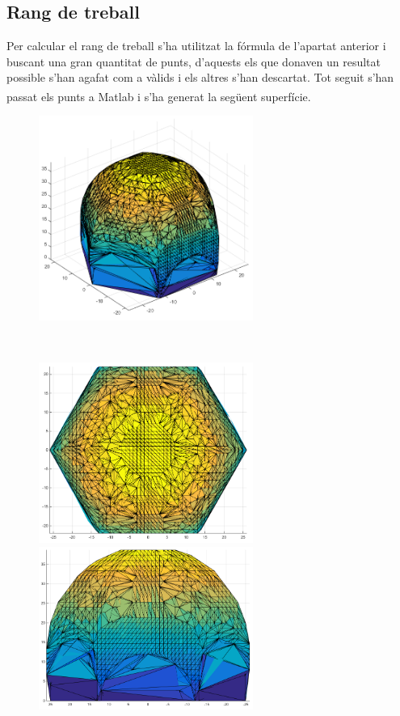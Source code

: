 \newpage
\subsection{Rang de treball}

Per calcular el rang de treball s'ha utilitzat la fórmula de l'apartat anterior i buscant una gran quantitat de punts, d'aquests els que donaven un resultat possible s'han agafat com a vàlids i els altres s'han descartat. Tot seguit s'han passat els punts a Matlab\textsuperscript{\textregistered} i s'ha generat la següent superfície.

\begin{figure}[h!]
\centering
\begin{minipage}{7cm}
\centering
\includegraphics[width=7cm]{./images/rangTreball}
\end{minipage}
\\
\hfill
\begin{minipage}{7cm}
\centering
\includegraphics[width=7cm]{./images/rangTreball2}
\end{minipage}
\hfill
\begin{minipage}{7cm}
\centering
\includegraphics[width=7cm]{./images/rangTreball3}
\end{minipage}
\hfill
\end{figure}

